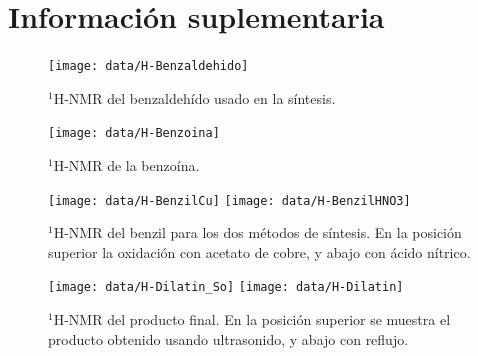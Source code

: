\documentclass[fleqn,10pt]{SelfArx}
\begin{document}
\newpage
\onecolumn
\section{Informaci\'on suplementaria}\label{sec: complementaria}
\begin{figure}[h]
	\centering
	\texttt{[image: data/H-Benzaldehido]}
	\caption{$^1$H-NMR del benzaldeh\'ido usado en la s\'intesis.}
	\label{fig: HNMR-Benzaldehido}
\end{figure}
\begin{figure}[h]
	\centering
	\texttt{[image: data/H-Benzoina]}
	\caption{$^1$H-NMR de la benzo\'ina.}
	\label{fig: HNMR-Benzoina}
\end{figure}
\begin{figure}[h]
	\centering
	\texttt{[image: data/H-BenzilCu]}
	\texttt{[image: data/H-BenzilHNO3]}
	\caption{$^1$H-NMR del benzil para los dos m\'etodos de s\'intesis. En la posici\'on superior la oxidaci\'on con acetato de cobre, y abajo con \'acido n\'itrico.}
	\label{fig: HNMR-Benzil}
\end{figure}
\begin{figure}[h]
	\centering
	\texttt{[image: data/H-Dilatin\_So]}
	\texttt{[image: data/H-Dilatin]}
	\caption{$^1$H-NMR del producto final. En la posici\'on superior se muestra el producto obtenido usando ultrasonido, y abajo con reflujo.}
	\label{fig: HNMR-Dilantin}
\end{figure}
\end{document}
